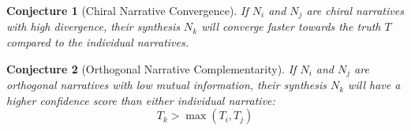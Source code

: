 \documentclass{article}
\newtheorem{conjecture}{Conjecture}
\begin{document}
\begin{conjecture}[Chiral Narrative Convergence]
If $N_i$ and $N_j$ are chiral narratives with high divergence, their synthesis $N_k$ will converge faster towards the truth $T$ compared to the individual narratives.
\end{conjecture}

\begin{conjecture}[Orthogonal Narrative Complementarity]
If $N_i$ and $N_j$ are orthogonal narratives with low mutual information, their synthesis $N_k$ will have a higher confidence score than either individual narrative:
\[
T_k > \max(T_i, T_j)
\]
\end{conjecture}
\end{document}
